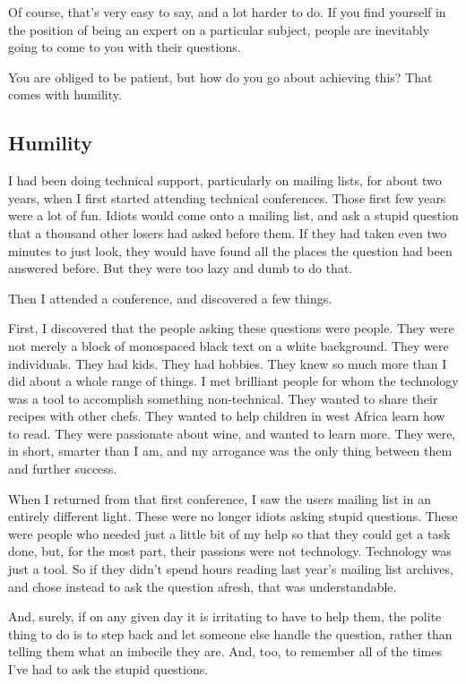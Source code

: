 Of course, that’s very easy to say, and a lot harder to do. If you find yourself in the position of being an expert on a particular subject, people are inevitably going to come to you with their questions.

You are obliged to be patient, but how do you go about achieving this? That comes with humility.

\subsection*{Humility}
I had been doing technical support, particularly on mailing lists, for about two years, when I first started attending technical conferences. Those first few years were a lot of fun. Idiots would come onto a mailing list, and ask a stupid question that a thousand other losers had asked before them. If they had taken even two minutes to just look, they would have found all the places the question had been answered before. But they were too lazy and dumb to do that.

Then I attended a conference, and discovered a few things.

First, I discovered that the people asking these questions were people. They were not merely a block of monospaced black text on a white background. They were individuals. They had kids. They had hobbies. They knew so much more than I did about a whole range of things. I met brilliant people for whom the technology was a tool to accomplish something non-technical. They wanted to share their recipes with other chefs. They wanted to help children in west Africa learn how to read. They were passionate about wine, and wanted to learn more. They were, in short, smarter than I am, and my arrogance was the only thing between them and further success.

When I returned from that first conference, I saw the users mailing list in an entirely different light. These were no longer idiots asking stupid questions. These were people who needed just a little bit of my help so that they could get a task done, but, for the most part, their passions were not technology. Technology was just a tool. So if they didn’t spend hours reading last year’s mailing list archives, and chose instead to ask the question afresh, that was understandable.

And, surely, if on any given day it is irritating to have to help them, the polite thing to do is to step back and let someone else handle the question, rather than telling them what an imbecile they are. And, too, to remember all of the times I’ve had to ask the stupid questions.

